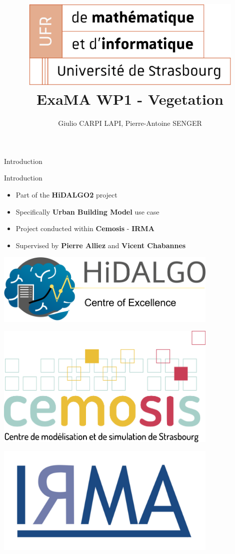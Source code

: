 \documentclass[12pt]{beamer}
\title[exMA WP1 Vegetation]{
  \includegraphics[width=0.8\textwidth]{images/logo_ufr.png}
  ExaMA WP1 - Vegetation}
\author[Carpi Lapi - Senger]{Giulio CARPI LAPI, Pierre-Antoine SENGER}
\begin{document}
\begin{frame}{Introduction}
  \titlepage
\end{frame}

\begin{frame}{Introduction}
  \Large
  \begin{itemize}
    \item Part of the \textbf{HiDALGO2} project
    \item Specifically \textbf{Urban Building Model} use case
    \item Project conducted within \textbf{Cemosis} - \textbf{IRMA}
    \item Supervised by \textbf{Pierre Alliez} and \textbf{Vicent Chabannes}
  \end{itemize}
  \vfill %
  \centering
  \begin{minipage}{0.3\textwidth}
      \centering
      \includegraphics[width=0.8\textwidth]{images/hidalgo2.png}
  \end{minipage}
  \begin{minipage}{0.3\textwidth}
      \centering
      \includegraphics[width=0.8\textwidth]{images/logo-cemosis.png}
  \end{minipage}
  \begin{minipage}{0.3\textwidth}
      \centering
      \includegraphics[width=0.8\textwidth]{images/logo_irma.png}
  \end{minipage}
\end{frame}
\end{document}
